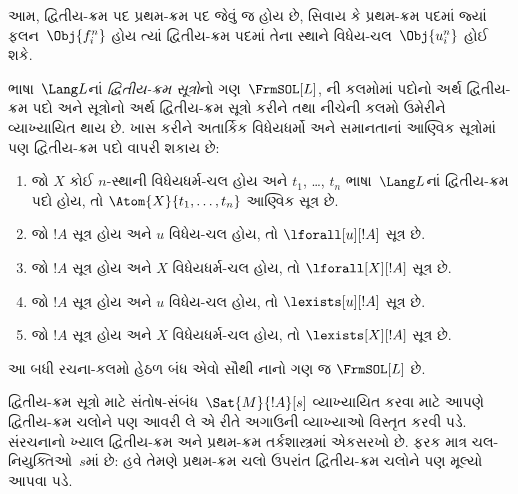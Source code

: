 \begin{explain}
આમ, દ્વિતીય-ક્રમ પદ પ્રથમ-ક્રમ પદ જેવું જ હોય છે, સિવાય કે પ્રથમ-ક્રમ
પદમાં જ્યાં ફલન~$\Obj{f^n_i}$ હોય ત્યાં દ્વિતીય-ક્રમ પદમાં
તેના સ્થાને વિધેય-ચલ~$\Obj{u^n_i}$ હોઈ શકે.
\end{explain}

\begin{defn}[દ્વિતીય-ક્રમ સૂત્ર]
ભાષા~$\Lang L$નાં \emph{દ્વિતીય-ક્રમ સૂત્રો}નો
ગણ~$\FrmSOL[L]$, ની કલમોમાં
પદોનો અર્થ દ્વિતીય-ક્રમ પદો અને સૂત્રોનો અર્થ દ્વિતીય-ક્રમ સૂત્રો
કરીને તથા નીચેની કલમો ઉમેરીને વ્યાખ્યાયિત થાય છે. ખાસ કરીને
અતાર્કિક વિધેયધર્મો અને સમાનતાનાં આણ્વિક સૂત્રોમાં પણ દ્વિતીય-ક્રમ
પદો વાપરી શકાય છે:
\begin{enumerate}
\item જો $X$ કોઈ $n$-સ્થાની વિધેયધર્મ-ચલ હોય અને $t_1$, \dots,
  $t_n$ ભાષા~$\Lang L$નાં દ્વિતીય-ક્રમ પદો હોય, તો
  $\Atom{X}{t_1,\ldots, t_n}$ આણ્વિક સૂત્ર છે.

\item જો $!A$ સૂત્ર હોય અને $u$ વિધેય-ચલ હોય,
  તો $\lforall[u][!A]$ સૂત્ર છે.

\item જો $!A$ સૂત્ર હોય અને $X$ વિધેયધર્મ-ચલ હોય,
  તો $\lforall[X][!A]$ સૂત્ર છે.

\item જો $!A$ સૂત્ર હોય અને $u$ વિધેય-ચલ હોય,
  તો $\lexists[u][!A]$ સૂત્ર છે.

\item જો $!A$ સૂત્ર હોય અને $X$ વિધેયધર્મ-ચલ હોય,
  તો $\lexists[X][!A]$ સૂત્ર છે.
\end{enumerate}
આ બધી રચના-કલમો હેઠળ બંધ એવો સૌથી નાનો ગણ જ $\FrmSOL[L]$ છે.
\end{defn}
\endgroup


\begingroup
\makeatletter{}\makeatother


\label{guunit:OLP-0326}


\begin{explain}
દ્વિતીય-ક્રમ સૂત્રો માટે સંતોષ-સંબંધ~$\Sat{M}{!A}[s]$
વ્યાખ્યાયિત કરવા માટે આપણે દ્વિતીય-ક્રમ ચલોને પણ આવરી લે
એ રીતે અગાઉની વ્યાખ્યાઓ વિસ્તૃત કરવી પડે. સંરચનાનો ખ્યાલ
દ્વિતીય-ક્રમ અને પ્રથમ-ક્રમ તર્કશાસ્ત્રમાં એકસરખો છે. ફરક માત્ર
ચલ-નિયુક્તિઓ~$s$માં છે: હવે તેમણે પ્રથમ-ક્રમ ચલો ઉપરાંત
દ્વિતીય-ક્રમ ચલોને પણ મૂલ્યો આપવા પડે.
\end{explain}

